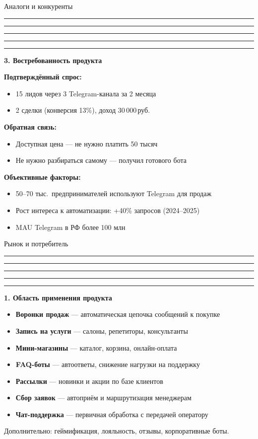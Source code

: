 \documentclass[aspectratio=169, 11pt]{beamer}
\newcommand{\cbar}{%
  \textcolor{cPink}{\rule{0.2\linewidth}{2pt}}%
  \textcolor{cPurple}{\rule{0.2\linewidth}{2pt}}%
  \textcolor{cRed}{\rule{0.2\linewidth}{2pt}}%
  \textcolor{cOrange}{\rule{0.2\linewidth}{2pt}}%
  \textcolor{cBlue}{\rule{0.2\linewidth}{2pt}}\par\medskip}
\newcommand{\R}{\,руб.}
\begin{document}
\begin{frame}{Аналоги и конкуренты}
\cbar
\textbf{3. Востребованность продукта}

\medskip
\textbf{\textcolor{cGray}{Подтверждённый спрос:}}
\begin{itemize}\setlength\itemsep{0pt}
  \item 15 лидов через 3 Telegram-канала за 2 месяца
  \item 2 сделки (конверсия 13\%), доход 30\,000\R
\end{itemize}

\medskip
\textbf{\textcolor{cGray}{Обратная связь:}}
\begin{itemize}\setlength\itemsep{0pt}
  \item \guillemotleft{}Доступная цена --- не нужно платить 50 тысяч\guillemotright{}
  \item \guillemotleft{}Не нужно разбираться самому --- получил готового бота\guillemotright{}
\end{itemize}

\medskip
\textbf{\textcolor{cGray}{Объективные факторы:}}
\begin{itemize}\setlength\itemsep{0pt}
  \item 50--70 тыс.\ предпринимателей используют Telegram для продаж
  \item Рост интереса к автоматизации: +40\% запросов (2024--2025)
  \item MAU Telegram в РФ более 100 млн
\end{itemize}
\end{frame}

\begin{frame}{Рынок и потребитель}
\cbar
\textbf{1. Область применения продукта}

\begin{itemize}\setlength\itemsep{2pt}
  \item \textbf{Воронки продаж} --- автоматическая цепочка сообщений к покупке
  \item \textbf{Запись на услуги} --- салоны, репетиторы, консультанты
  \item \textbf{Мини-магазины} --- каталог, корзина, онлайн-оплата
  \item \textbf{FAQ-боты} --- автоответы, снижение нагрузки на поддержку
  \item \textbf{Рассылки} --- новинки и акции по базе клиентов
  \item \textbf{Сбор заявок} --- автоприём и маршрутизация менеджерам
  \item \textbf{Чат-поддержка} --- первичная обработка с передачей оператору
\end{itemize}

\smallskip
\textcolor{cGray}{\small Дополнительно: геймификация, лояльность, отзывы, корпоративные боты.}
\end{frame}
\end{document}
